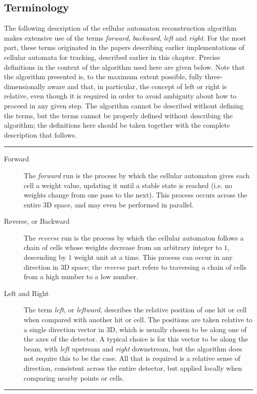 \subsection{Terminology}
The following description of the cellular automaton reconstruction algorithm makes extensive use of the terms \emph{forward}, \emph{backward}, \emph{left} and \emph{right}. For the most part, these terms originated in the papers describing earlier implementations of cellular automata for tracking, described earlier in this chapter. Precise definitions in the context of the algorithm used here are given below. Note that the algorithm presented is, to the maximum extent possible, fully three-dimensionally aware and that, in particular, the concept of left or right is relative, even though it is required in order to avoid ambiguity about how to proceed in any given step. The algorithm cannot be described without defining the terms, but the terms cannot be properly defined without describing the algorithm; the definitions here should be taken together with the complete description that follows.

\vspace{1em}\hrule\vspace{1em}
\begin{description}
    \item[Forward]
        The \emph{forward} run is the process by which the cellular automaton gives each cell a weight value, updating it until a stable state is reached (i.e. no weights change from one pass to the next). This process occurs across the entire 3D space, and may even be performed in parallel.
    
    \item[Reverse, or Backward]
        The \emph{reverse} run is the process by which the cellular automaton follows a chain of cells whose weights decrease from an arbitrary integer to $1$, descending by $1$ weight unit at a time. This process can occur in any direction in 3D space; the \emph{reverse} part refers to traversing a chain of cells from a high number to a low number.

    \item[Left and Right]
        The term \emph{left}, or \emph{leftward}, describes the relative position of one hit or cell when compared with another hit or cell. The positions are taken relative to a single direction vector in 3D, which is usually chosen to be along one of the axes of the detector. A typical choice is for this vector to be along the beam, with \emph{left} upstream and \emph{right} downstream, but the algorithm does not require this to be the case. All that is required is a relative sense of direction, consistent across the entire detector, but applied locally when comparing nearby points or cells.
\end{description}
\vspace{1em}\hrule\vspace{1em}


